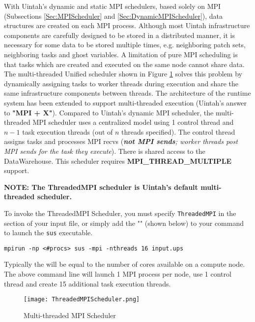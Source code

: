 With Uintah's dynamic and static MPI schedulers, based solely on MPI
(Subsections \ref{Sec:MPIScheduler} and \ref{Sec:DynamicMPIScheduler}), data
structures are created on each MPI process. Although most Uintah infrastructure
components are carefully designed to be stored in a distributed manner, it is
necessary for some data to be stored multiple times, e.g. neighboring patch
sets, neighboring tasks and ghost variables. A limitation of pure MPI
scheduling is that tasks which are created and executed on the same node cannot
share data. The multi-threaded Unified scheduler shown in Figure
\ref{fig:UnifiedScheduler} solves this problem by dynamically assigning tasks
to worker threads during execution and share the same infrastructure components
between threads. The architecture of the runtime system has been extended to
support multi-threaded execution (Uintah's answer to \textbf{"MPI + X"}).
Compared to Uintah’s dynamic MPI scheduler, the multi-threaded MPI scheduler
uses a centralized model using 1 control thread and $n-1$ task execution
threads (out of $n$ threads specified). The control thread assigns tasks and
processes MPI recvs (\emph{\textbf{not MPI sends}; worker threads post MPI
sends for the task they execute}). There is shared access to the DataWarehouse.
This scheduler requires \textbf{MPI\_THREAD\_MULTIPLE} support.

\vspace{20pt}
\textbf{NOTE: The ThreadedMPI scheduler is Uintah's default multi-threaded
scheduler.}
\vspace{20pt}

To invoke the ThreadedMPI Scheduler, you must specify \texttt{ThreadedMPI} in
the  section of your input file, or simply add the
"" (shown below) to your command to launch the \texttt{sus}
executable.

\begin{Verbatim}[fontsize=\footnotesize]
mpirun -np <#procs> sus -mpi -nthreads 16 input.ups
\end{Verbatim}

Typically the  will be equal to the number of cores available on a
compute node. The above command line will launch 1 MPI process per node, use 1
control thread and create 15  additional task execution
threads.

\begin{figure}[H]
  \centering
  \texttt{[image: ThreadedMPIScheduler.png]}
  \caption{Multi-threaded MPI Scheduler}
  \label{fig:UnifiedScheduler}
\end{figure}


